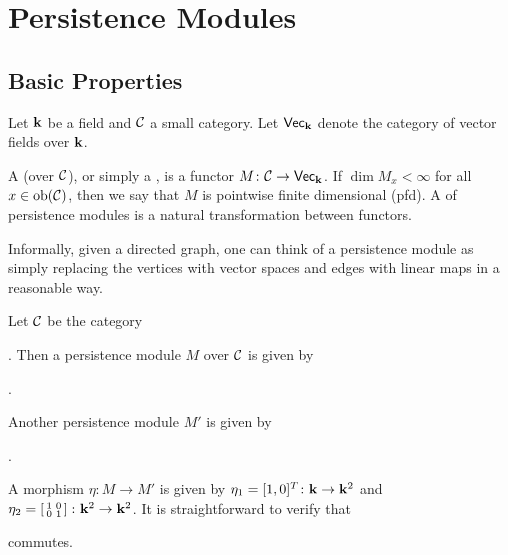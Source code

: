 \chapter{Persistence Modules}\label{chap:persistenceModules}
\section{Basic Properties}\label{sec:basicProperties}
Let $\mathbf{k}$ be a field and $\mathcal{C}$ a small category. 
Let $\normalfont\mathsf{Vec}_{\mathbf{k}}$ denote the category of vector fields over $\mathbf{k}$.
\begin{definition}
    A  (over $\mathcal{C}$), or simply a , is a functor $M\colon \mathcal{C}\to\normalfont\mathsf{Vec}_{\mathbf{k}}$.
    If $\dim M_x<\infty$ for all $x\in\operatorname{ob}(\mathcal{C})$, then we say that $M$ is pointwise finite dimensional (pfd).
    A  of persistence modules is a natural transformation between functors.
\end{definition}
Informally, given a directed graph, one can think of a persistence module as simply replacing the vertices with vector spaces and edges with linear maps in a reasonable way.
\begin{example}\label{example:persistenceModule}
    Let $\mathcal{C}$ be the category  .
    Then a persistence module $M$ over $\mathcal{C}$ is given by
    \begin{center}
        .
    \end{center}
    Another persistence module $M'$ is given by
    \begin{center}
        .
    \end{center}
    A morphism $\eta:M\to M'$ is given by $\eta_1=[1,0]^T\colon\mathbf{k}\to\mathbf{k}^2$ and $\eta_2=\left[\begin{smallmatrix} 1 & 0\\ 0 & 1 \end{smallmatrix}\right]\colon\mathbf{k}^2\to\mathbf{k}^2$. It is straightforward to verify that
    \begin{center}
    \end{center}
    commutes.
\end{example}
